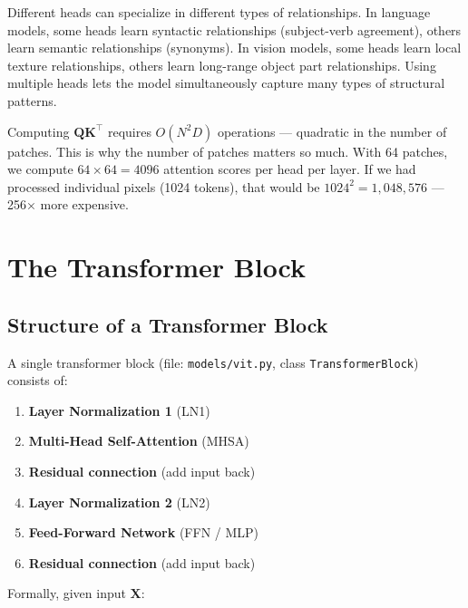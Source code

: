 \documentclass[12pt, a4paper]{report}
\newcommand{\mat}[1]{\mathbf{#1}}
\begin{document}
\begin{intuitionbox}
Different heads can specialize in different types of relationships. In language models, some heads learn syntactic relationships (subject-verb agreement), others learn semantic relationships (synonyms). In vision models, some heads learn local texture relationships, others learn long-range object part relationships. Using multiple heads lets the model simultaneously capture many types of structural patterns.
\end{intuitionbox}

\begin{conceptbox}
Computing $\mat{Q}\mat{K}^\top$ requires $O(N^2 D)$ operations — quadratic in the number of patches. This is why the number of patches matters so much. With 64 patches, we compute $64 \times 64 = 4096$ attention scores per head per layer. If we had processed individual pixels (1024 tokens), that would be $1024^2 = 1,048,576$ — 256× more expensive.
\end{conceptbox}

\chapter{The Transformer Block}

\section{Structure of a Transformer Block}

A single transformer block (file: \texttt{models/vit.py}, class \texttt{TransformerBlock}) consists of:

\begin{enumerate}
    \item \textbf{Layer Normalization 1} (LN1)
    \item \textbf{Multi-Head Self-Attention} (MHSA)
    \item \textbf{Residual connection} (add input back)
    \item \textbf{Layer Normalization 2} (LN2)
    \item \textbf{Feed-Forward Network} (FFN / MLP)
    \item \textbf{Residual connection} (add input back)
\end{enumerate}

Formally, given input $\mat{X}$:
\end{document}
